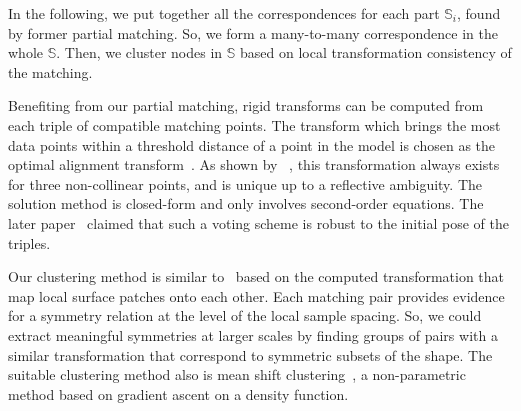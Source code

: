 In the following, we put together all the correspondences for each part $\mathbb{S}_i$, found by former partial matching.
So, we form a many-to-many correspondence in the whole $\mathbb{S}$.
Then, we cluster nodes in $\mathbb{S}$ based on local transformation consistency of the matching.

Benefiting from our partial matching, rigid transforms can be computed from each triple of compatible matching points.
The transform which brings the most data points within a threshold distance of a point in the model is chosen as the optimal alignment transform~\cite{Huttenlocher1990}.
As shown by ~\cite{Huttenlocher1990}, this transformation always exists for three non-collinear points, and is unique up to a reflective ambiguity.
The solution method is closed-form and only involves second-order equations.
The later paper~\cite{Gelfand05} claimed that such a voting scheme is robust to the initial pose of the triples.

Our clustering method is similar to~\cite{mitra2006} based on the computed transformation that map local surface patches onto each other.
Each matching pair provides evidence for a symmetry relation at the level of the local sample spacing.
So, we could extract meaningful symmetries at larger scales by finding groups of pairs with a similar transformation
that correspond to symmetric subsets of the shape.
The suitable clustering method also is mean shift clustering~\cite{Comaniciu2002}, a non-parametric method based on gradient ascent on a density function.










